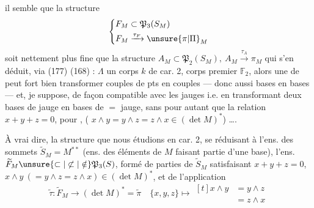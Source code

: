 il semble que la structure 
\[
 \left\{\begin{aligned}F_M&\subset\mathfrak P_3(S_M)\\ F_M&\xrightarrow{\tau_F}\unsure{\pi|\Pi}_M\end{aligned}\right.
\]
soit nettement plus fine que la structure $A_M\subset\mathfrak P_2(S_M),\ A_M\xrightarrow{\tau_A}\pi_M$ qui s'en déduit, via (177) (168) :
$\Lambda$ un corps $k$ de car. 2, \deleted{\unsure{$\ne$}} corps premier $\mathbb F_2$, alors une  de  peut fort bien transformer couples de pts    en couples  --- donc aussi bases en bases --- et, je suppose, de façon compatible avec les jauges i.e. en transformant  deux bases de  jauge en   bases de $=$ jauge, sans pour autant que  la relation $x+y+z=0$, pour , ( $x\wedge y=y\wedge z=z\wedge x\in(\det M)^*$) \ldots.

À vrai dire, la structure que nous étudions en car. 2, se réduisant  à l'ens. des sommets $\widetilde S_M=M^{**}$ (ens. des éléments de $M$ faisant partie d'une base), l'ens. $\widetilde F_M\unsure{\subset|\not\subset|\notin}\mathfrak P_3(S)$, formé de parties  de $\widetilde S_M$ satisfaisant $x+y+z=0$, $x\wedge y\ (=y\wedge z=z\wedge x)\in(\det M)^*$, et de l'application
\[
 \widetilde\tau:\widetilde F_M\longrightarrow(\det M)^*=\widetilde\pi\quad
 \{x,y,z\}\longmapsto\begin{aligned}[t]x\wedge y&=y\wedge z\\&=z\wedge x\end{aligned}\tag*{(178)}
\]
